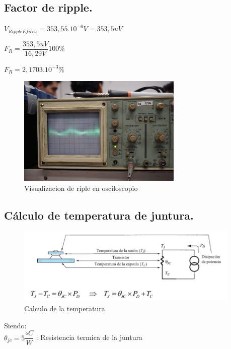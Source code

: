 \subsection{Factor de ripple.}

$V_{RippleEficaz} = 353,55 . 10^{-6} V = 353,5 uV $

$F_R = \dfrac{353,5 uV}{16,29 V} 100\percent $

$F_R = 2,1703 . 10^{-3}\percent $ \\

\begin{figure}[H]
  \centering
  \includegraphics[width=0.70\textwidth]{images/medicionRipple.png}
  \caption{Visualizacion de riple en osciloscopio}
\end{figure}


\subsection{Cálculo de temperatura de juntura.}

\begin{figure}[H]
  \centering
  \includegraphics[width=0.95\textwidth]{images/calculoTemperatura.png}
  \caption{Calculo de la temperatura}
\end{figure}

Siendo: \\

$\theta_{jc} = 5\dfrac{\circ C}{W} $ : Resistencia termica de la juntura \\

